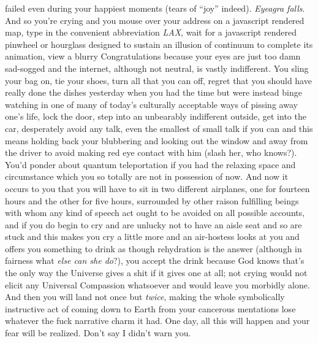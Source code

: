 \documentclass{article}
\begin{document}
failed even during your happiest moments (tears of ``joy'' indeed).
\textit{Eyeagra falls}. And so you're crying and you mouse over your
address on a javascript rendered map, type in the convenient
abbreviation \textit{LAX}, wait for a javascript rendered pinwheel or
hourglass designed to sustain an illusion of continuum to complete its
animation, view a blurry Congratulations because your eyes are just too
damn sad-sogged and the internet, although not neutral, is vastly
indifferent. You sling your bag on, tie your shoes, turn all that you
can off, regret that you should have really done the dishes yesterday
when you had the time but were instead binge watching in one of many of
today's culturally acceptable ways of pissing away one's life, lock the
door, step into an unbearably indifferent outside, get into the car,
desperately avoid any talk, even the smallest of small talk if you can
and this means holding back your blubbering and looking out the window
and away from the driver to avoid making red eye contact with him (slash
her, who knows?). You'd ponder about quantum teleportation if you had
the relaxing space and circumstance which you so totally are not in
possession of now. And now it occurs to you that you will have to sit in
two different airplanes, one for fourteen hours and the other for five
hours, surrounded by other raison fulfilling beings with whom any kind
of speech act ought to be avoided on all possible accounts, and if you
do begin to cry and are unlucky not to have an aisle seat and so are
stuck and this makes you cry a little more and an air-hostess looks at
you and offers you something to drink as though rehydration is the
answer (although in fairness what \textit{else can she do}?), you accept
the drink because God knows that's the only way the Universe gives
a shit if it gives one at all; not crying would not elicit any Universal
Compassion whatsoever and would leave you morbidly alone. And then you
will land not once but \textit{twice}, making the whole symbolically
instructive act of coming down to Earth from your cancerous mentations
lose whatever the fuck narrative charm it had. One day, all this will
happen and your fear will be realized. Don't say I didn't warn you.
\end{document}
